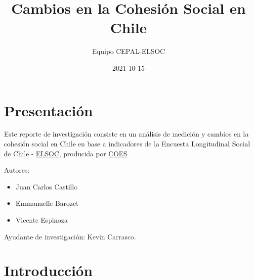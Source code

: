\documentclass[
  12pt,
]{book}
\title{Cambios en la Cohesión Social en Chile}
\author{Equipo CEPAL-ELSOC}
\date{2021-10-15}
\providecommand{\tightlist}{%
  \setlength{\itemsep}{0pt}\setlength{\parskip}{0pt}}
\begin{document}
\maketitle

{
\hypersetup{linkcolor=}
\setcounter{tocdepth}{1}
\tableofcontents
}
\listoffigures
\listoftables
{}
\hypertarget{presentaciuxf3n}{%
\chapter*{Presentación}\label{presentaciuxf3n}}

Este reporte de investigación consiste en un análisis de medición y cambios en la cohesión social en Chile en base a indicadores de la Encuesta Longitudinal Social de Chile - \href{https://coes.cl/encuesta-panel/}{ELSOC}, producida por \href{https://coes.cl/}{COES}

Autores:

\begin{itemize}
\tightlist
\item
  Juan Carlos Castillo
\item
  Emmanuelle Barozet
\item
  Vicente Espinoza
\end{itemize}

Ayudante de investigación: Kevin Carrasco.

\hypertarget{introducciuxf3n}{%
\chapter*{Introducción}\label{introducciuxf3n}}
\end{document}

